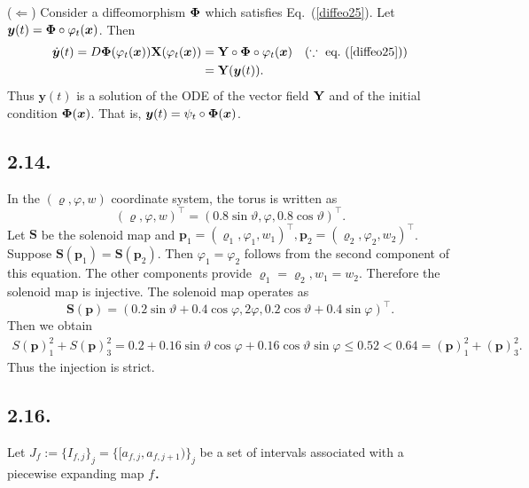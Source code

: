 \documentclass[a4paper,11pt,fleqn]{article}
\begin{document}
($\Leftarrow$) Consider a diffeomorphism ${\bf \Phi}$ which satisfies Eq.~(\ref{diffeo25}). Let ${\bm y}(t) = {\bf \Phi}\circ {\varphi}_t ({\bm x})$. Then 
\begin{align}
    \dot{\bm y}(t) = D{\bf \Phi}({\varphi}_t({\bm x})){\bf X}({\varphi}_t({\bm x})) &= {\bf Y}\circ {\bf \Phi} \circ {\varphi}_t ({\bm x}) \quad (\because \ \text{eq.~}(\ref{diffeo25})) \nonumber \\
    &= {\bf Y}({\bm y}(t)). 
\end{align}
Thus ${\bm y}(t)$ is a solution of the ODE of the vector field ${\bf Y}$ and of the initial condition ${\bf \Phi}({\bm x})$. That is, ${\bm y} (t)= {\psi}_t \circ {\bf \Phi}({\bm x})$. 

\hruleskip

\subsection{2.14.}
In the $(\varrho,\varphi,w)$ coordinate system, the torus is written as 
\begin{equation}
    (\varrho,\varphi,w)^\top = (0.8\sin{\vartheta},\varphi,0.8\cos{\vartheta})^\top.
\end{equation}
Let ${\bm S}$ be the solenoid map and ${\bm p}_1 = (\varrho_1,\varphi_1,w_1)^\top, {\bm p}_2 = (\varrho_2,\varphi_2,w_2)^\top$. Suppose ${\bm S}({\bm p}_1) = {\bm S}({\bm p}_2) $. Then $\varphi_1=\varphi_2$ follows from the second component of this equation. The other components provide $\varrho_1=\varrho_2, w_1 = w_2$. Therefore the solenoid map is injective. The solenoid map operates as
\begin{equation}
    {\bm S}({\bm p})= (0.2\sin{\vartheta}+0.4\cos{\varphi},2\varphi,0.2\cos{\vartheta}+0.4\sin{\varphi})^\top. 
\end{equation}
Then we obtain 
\begin{align}
    S({\bm p})_1^2+S({\bm p})_3^2 = 0.2+0.16\sin{\vartheta}\cos{\varphi}+0.16\cos{\vartheta}\sin{\varphi} \le 0.52 < 0.64 = ({\bm p})_1^2+({\bm p})_3^2. 
\end{align}
Thus the injection is strict. 

\hruleskip

\subsection{2.16.}
Let $J_f := \{I_{f,j}\}_j = \{[a_{f,j},a_{f,j+1})\}_j$ be a set of intervals associated with a piecewise expanding map $f$．
\end{document}
